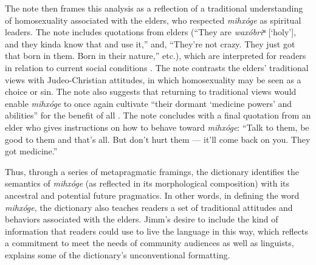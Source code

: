 \documentclass[output=paper]{LSP/langsci}
\begin{document}
The note then frames this analysis as a reflection of a traditional understanding of homosexuality associated with the elders, who respected \emph{mihxóge} as spiritual leaders. The note includes quotations from elders (``They are \emph{waxóbriⁿ} [`holy'], and they kinda know that and use it,'' and, ``They're not crazy. They just got that born in them. Born in their nature,'' etc.), which are interpreted for readers in relation to current social conditions \citep[7]{Goodtracks2008}. The note contrasts the elders' traditional views with Judeo-Christian attitudes, in which homosexuality may be seen as a choice or sin. The note also suggests that returning to traditional views would enable \emph{mihxóge} to once again cultivate ``their dormant `medicine powers' and abilities'' for the benefit of all \citep[7]{Goodtracks2008}. The note concludes with a final quotation from an elder who gives instructions on how to behave toward \emph{mihxóge}: ``Talk to them, be good to them and that's all. But don't hurt them --- it'll come back on you. They got medicine.'' \citep[7]{Goodtracks2008}

Thus, through a series of metapragmatic framings, the dictionary identifies the semantics of \emph{mihxóge} (as reflected in its morphological composition) with its ancestral and potential future pragmatics. In other words, in defining the word \emph{mihxóge}, the dictionary also teaches readers a set of traditional attitudes and behaviors associated with the elders. Jimm's desire to include the kind of information that readers could use to live the language in this way, which reflects a commitment to meet the needs of community audiences as well as linguists, explains some of the dictionary's unconventional formatting.
\end{document}
